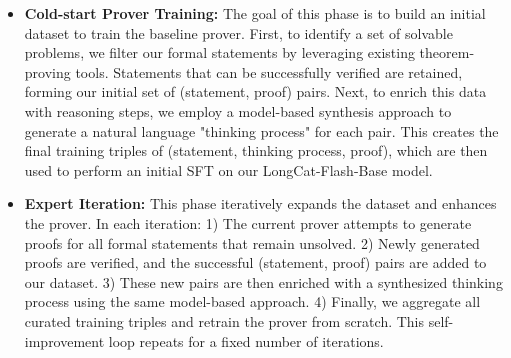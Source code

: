 \begin{itemize}
    \item \textbf{Cold-start Prover Training:} The goal of this phase is to build an initial dataset to train the baseline prover. First, to identify a set of solvable problems, we filter our formal statements by leveraging existing theorem-proving tools. Statements that can be successfully verified are retained, forming our initial set of (statement, proof) pairs. Next, to enrich this data with reasoning steps, we employ a model-based synthesis approach to generate a natural language "thinking process" for each pair. This creates the final training triples of (statement, thinking process, proof), which are then used to perform an initial SFT on our LongCat-Flash-Base model.
    

    \item \textbf{Expert Iteration:} This phase iteratively expands the dataset and enhances the prover. In each iteration: 1) The current prover attempts to generate proofs for all formal statements that remain unsolved. 2) Newly generated proofs are verified, and the successful (statement, proof) pairs are added to our dataset. 3) These new pairs are then enriched with a synthesized thinking process using the same model-based approach. 4) Finally, we aggregate all curated training triples and retrain the prover from scratch. This self-improvement loop repeats for a fixed number of iterations.
    
\end{itemize}


